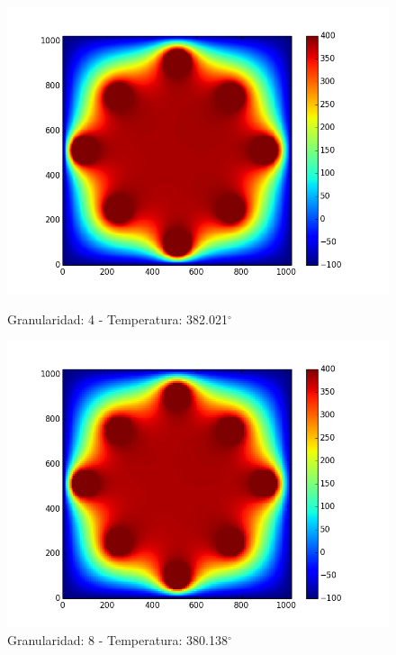 \begin{figure}[htb]
\begin{center}
\includegraphics[scale=0.3]{imagenes/caso1_4.png} 
\caption{Granularidad: 4 - Temperatura: 382.021$^{\circ}$} 
        \end{center}
\endminipage\hfill
{}
\begin{center}
\includegraphics[scale=0.3]{imagenes/caso1_8.png} 
\caption{Granularidad: 8 - Temperatura: 380.138$^{\circ}$} 
        \end{center}
\endminipage\hfill 
\end{figure}

